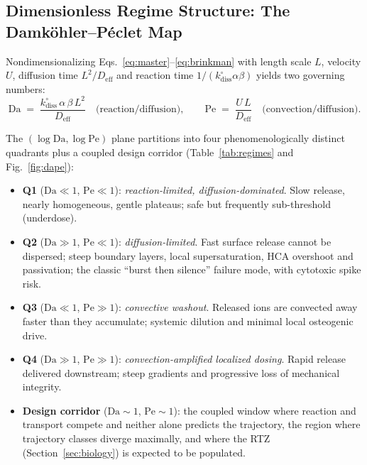 \documentclass[11pt]{article}
\newcommand{\Veff}{D_{\mathrm{eff}}}
\begin{document}
\subsection{Dimensionless Regime Structure: The Damk\"ohler--P\'eclet Map}


Nondimensionalizing Eqs.~\eqref{eq:master}--\eqref{eq:brinkman} with length scale $L$, velocity $U$, diffusion time $L^{2}/\Veff$ and reaction time $1/(k^{\circ}_{\mathrm{diss}}\alpha\beta)$ yields two governing numbers:
\begin{equation}
\mathrm{Da} \;=\; \frac{k^{\circ}_{\mathrm{diss}}\,\alpha\,\beta\,L^{2}}{\Veff}\quad\text{(reaction/diffusion)},\qquad
\mathrm{Pe} \;=\; \frac{U\,L}{\Veff}\quad\text{(convection/diffusion)}.
\label{eq:Da_Pe}
\end{equation}


The $(\log\mathrm{Da},\log\mathrm{Pe})$ plane partitions into four phenomenologically distinct quadrants plus a coupled design corridor (Table~\ref{tab:regimes} and Fig.~\ref{fig:dape}):


\begin{itemize}[leftmargin=1.5em,itemsep=1pt]
\item \textbf{Q1} ($\mathrm{Da}\ll1$, $\mathrm{Pe}\ll1$): \emph{reaction-limited, diffusion-dominated}. Slow release, nearly homogeneous, gentle plateaus; safe but frequently sub-threshold (underdose).
\item \textbf{Q2} ($\mathrm{Da}\gg1$, $\mathrm{Pe}\ll1$): \emph{diffusion-limited}. Fast surface release cannot be dispersed; steep boundary layers, local supersaturation, HCA overshoot and passivation; the classic ``burst then silence'' failure mode, with cytotoxic spike risk.
\item \textbf{Q3} ($\mathrm{Da}\ll1$, $\mathrm{Pe}\gg1$): \emph{convective washout}. Released ions are convected away faster than they accumulate; systemic dilution and minimal local osteogenic drive.
\item \textbf{Q4} ($\mathrm{Da}\gg1$, $\mathrm{Pe}\gg1$): \emph{convection-amplified localized dosing}. Rapid release delivered downstream; steep gradients and progressive loss of mechanical integrity.
\item \textbf{Design corridor} ($\mathrm{Da}\sim1$, $\mathrm{Pe}\sim1$): the coupled window where reaction and transport compete and neither alone predicts the trajectory, the region where trajectory classes diverge maximally, and where the RTZ (Section~\ref{sec:biology}) is expected to be populated.
\end{itemize}
\end{document}

